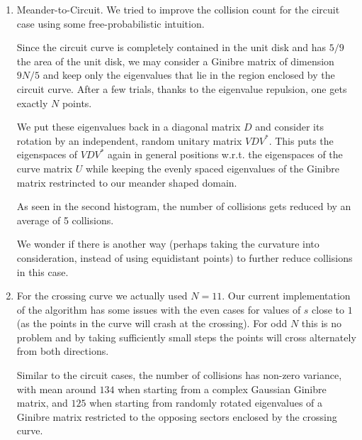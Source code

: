 \documentclass{article}
\begin{document}
\begin{enumerate}
		\item Meander-to-Circuit. We tried to improve the collision count for the circuit case 
		using some free-probabilistic intuition.

		Since the circuit curve is completely contained in the unit disk
		and has $5/9$ the area of the unit disk, we may consider a Ginibre matrix of dimension $9N/5$ and
		keep only the eigenvalues that lie in the region enclosed by the circuit curve.
		After a few trials, thanks to the eigenvalue repulsion, one gets exactly $N$ points. 
		
		We put these eigenvalues back in a diagonal matrix $D$ and consider its rotation 
		by an independent, random unitary matrix $VDV^*$. 
		This puts the eigenspaces of $VDV^*$ again in general positions w.r.t. 
		the eigenspaces of the curve matrix $U$ while keeping the evenly spaced eigenvalues 
		of the Ginibre matrix restrincted to our meander shaped domain. 
	
		As seen in the second histogram, the number of collisions gets reduced by an 
		average of 5 collisions. 
		
		We wonder if there is another way (perhaps taking the curvature into consideration, 
		instead of using equidistant points) to further reduce collisions in this case.

		\item For the crossing curve we actually used $N=11$. Our current implementation of the algorithm
		has some issues with the even cases for values of $s$ close to $1$ 
		(as the points in the curve will crash at the crossing). 
		For odd $N$ this is no problem and by taking sufficiently small steps the points will cross
		alternately from both directions.

		Similar to the circuit cases, the number of collisions has non-zero variance, 
		with mean around $134$ when starting from a complex Gaussian Ginibre matrix, 
		and $125$ when starting from randomly rotated eigenvalues of a Ginibre matrix
		restricted to the opposing sectors enclosed by the crossing curve.


\end{enumerate}
\end{document}
